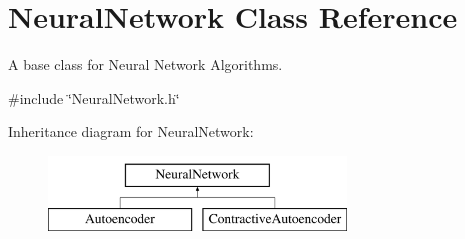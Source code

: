 \hypertarget{classNeuralNetwork}{}\section{Neural\+Network Class Reference}
\label{classNeuralNetwork}


A base class for Neural Network Algorithms.  




{\ttfamily \#include \char`\"{}Neural\+Network.\+h\char`\"{}}

Inheritance diagram for Neural\+Network\+:\begin{figure}[H]
\begin{center}
\leavevmode
\includegraphics[height=2.000000cm]{classNeuralNetwork}
\end{center}
\end{figure}
